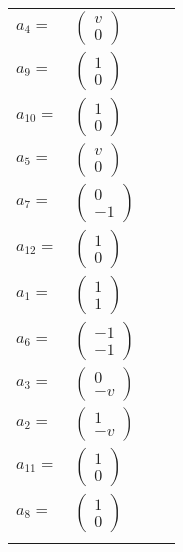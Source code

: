 \documentclass[1p]{elsarticle_modified}
\theoremstyle{definition}
\begin{document}
\begin{tabular}{m{7pt} m{180pt} m{7pt} m{180pt} }
\flushright $a_{4}=$&$\begin{pmatrix}v\\0\end{pmatrix}$ \\
\flushright $a_{9}=$&$\begin{pmatrix}1\\0\end{pmatrix}$ \\
\flushright $a_{10}=$&$\begin{pmatrix}1\\0\end{pmatrix}$ \\
\flushright $a_{5}=$&$\begin{pmatrix}v\\0\end{pmatrix}$ \\
\flushright $a_{7}=$&$\begin{pmatrix}0\\-1\end{pmatrix}$ \\
\flushright $a_{12}=$&$\begin{pmatrix}1\\0\end{pmatrix}$ \\
\flushright $a_{1}=$&$\begin{pmatrix}1\\1\end{pmatrix}$ \\
\flushright $a_{6}=$&$\begin{pmatrix}-1\\-1\end{pmatrix}$ \\
\flushright $a_{3}=$&$\begin{pmatrix}0\\- v\end{pmatrix}$ \\
\flushright $a_{2}=$&$\begin{pmatrix}1\\- v\end{pmatrix}$ \\
\flushright $a_{11}=$&$\begin{pmatrix}1\\0\end{pmatrix}$ \\
\flushright $a_{8}=$&$\begin{pmatrix}1\\0\end{pmatrix}$\\&\end{tabular}
\end{document}
